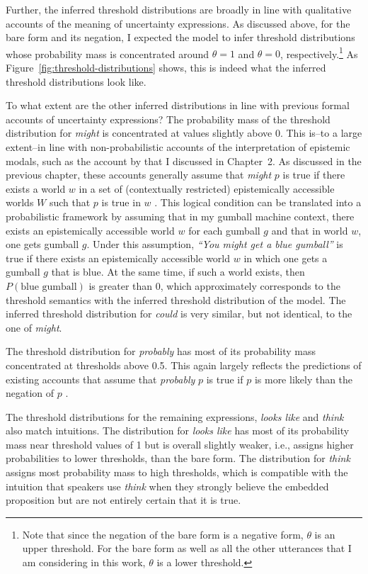 Further, the inferred threshold distributions are broadly in line with qualitative accounts of the meaning of uncertainty expressions.
As discussed above, for the bare form and its negation, I expected the model to infer threshold distributions whose probability mass is concentrated 
around $\theta=1$ and $\theta=0$, respectively.\footnote{Note that since the negation of the bare form is a negative form, $\theta$ is an upper threshold. For the bare form as well as
all the other utterances that I am considering in this work, $\theta$ is a lower threshold.} As  Figure~\ref{fig:threshold-distributions} shows, this is indeed what
the inferred threshold distributions look like. 

To what extent are the other inferred distributions in line with previous formal accounts of uncertainty expressions? 
The probability mass of the threshold distribution for \textit{might} is  concentrated at values slightly above 0. This
is--to a large extent--in line with non-probabilistic accounts of the interpretation of epistemic modals, such as the account
by \cite{Kratzer2012} that I discussed in Chapter~2. As discussed in the previous chapter, these accounts generally assume that \textit{might} $p$ is true 
if there exists a world $w$ in a set of (contextually restricted) epistemically accessible worlds $W$ such that $p$ is true in $w$ 
\parencite[e.g.,][]{Kratzer1991,Swanson2008,Hacquard2011}. This logical condition can be translated into a probabilistic framework by assuming that 
in my gumball machine context, there exists an epistemically accessible world $w$ for each gumball $g$ and that in world $w$, one gets gumball $g$. 
Under this assumption, \textit{``You might get a blue gumball''} is true if there exists an epistemically accessible world $w$  in which one gets a
gumball $g$ that is blue. At the same time, if such a world exists, then $P(\mbox{blue gumball})$ is greater than 0, which approximately corresponds
to the threshold semantics with the inferred threshold distribution of the model. The inferred threshold distribution for \textit{could} is very similar, 
but not identical, to the one of \textit{might}.

The threshold distribution for \textit{probably} has most of its probability mass concentrated at thresholds above 0.5. This again largely reflects the predictions of 
existing accounts that assume that \textit{probably} $p$ is true if $p$ is more likely than the negation of $p$ .

The threshold distributions for the remaining expressions, \textit{looks like} and \textit{think} also match intuitions. The distribution for 
\textit{looks like} has most of its probability mass near threshold values of 1 but is overall slightly weaker, i.e., assigns higher probabilities to lower thresholds,
than the bare form. The distribution for \textit{think} assigns most probability mass to high thresholds, which is compatible with the intuition
that speakers use \textit{think} when they strongly believe the embedded proposition but are not entirely certain that it is true.

